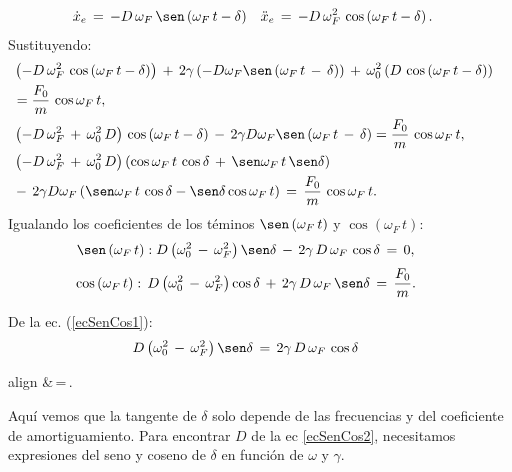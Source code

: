 \documentclass[11pt]{article}
\begin{document}
\begin{align*}
\dot{x}_e\,&=\,-D\,\omega_F\,\sen\left(\omega_F\,t-\delta \right) &\ddot{x}_e\,&=\,-D\,\omega_F^2\,\cos\left(\omega_F\,t-\delta \right).
\end{align*}
Sustituyendo:
\begin{align*}
&\left( -D\,\omega_F^2\,\cos\left(\omega_F\,t-\delta \right) \right) \,+\, 2 \gamma \left(-D\omega_F \sen \left( \omega_F \, t \,-\,\delta \right) \right)\,+ \, \omega_0^2 \left( D\,\cos\left(\omega_F\,t-\delta \right) \right)&& \\
&=\frac{F_0}{m}\,\cos\omega_F\,t, && \\
&\left(- D\,\omega_F^2\,+\,\omega_0^2\,D\right) \,\cos\left(\omega_F\,t-\delta \right) \,-\, 2 \gamma D\omega_F \sen \left( \omega_F \, t \,-\,\delta \right)  =\frac{F_0}{m}\,\cos\omega_F\,t, &&\\
&\left(- D\,\omega_F^2\,+\,\omega_0^2\,D\right)\left( \cos\omega_F\,t\, \cos \delta \, +\,\sen\omega_F\,t\, \sen \delta  \right)&&\\
&-\, 2 \gamma D\omega_F \left(\sen  \omega_F \, t \, \cos \delta - \sen \delta \cos \omega_F \, t\right) \,=\,\frac{F_0}{m}\, \cos\omega_F\,t.&&
\end{align*}
Igualando los coeficientes de los téminos $\sen\left( \omega_F \,t\right)$ y $\cos\left( \omega_F \,t\right)$:
\begin{align}
\sen\left( \omega_F \,t\right)&: D\left(\omega_0^2\,-\, \omega_F^2\right) \sen \delta  \,-\,2\gamma \,D\,\omega_F\,\cos\delta \,=\,0,  && 
\label{ecSenCos1}
\end{align} 
\begin{align}
\cos\left( \omega_F \,t\right)&: \,D\left(\omega_0^2\,-\, \omega_F^2\right) \cos \delta \,+\,2\gamma \,D\,\omega_F\,\sen\delta \,= \,\frac{F_0}{m}. &&
\label{ecSenCos2}
\end{align} 

De la ec. (\ref{ecSenCos1}): 
\begin{align*}
&D\left(\omega_0^2\,-\, \omega_F^2\right) \sen \delta  \,=\,2\gamma \,D\,\omega_F\,\cos\delta \nonumber && 
\end{align*}
\begin{important}[purple]{align}
&\tan\delta \,=\,.
\label{tand}
\end{important}	
Aquí vemos que la tangente de $\delta$ solo depende de las frecuencias y del coeficiente de amortiguamiento. Para encontrar $D$ de la ec \ref{ecSenCos2}, necesitamos expresiones del seno y coseno de $\delta$ en función de $\omega$ y $\gamma$.
\end{document}
